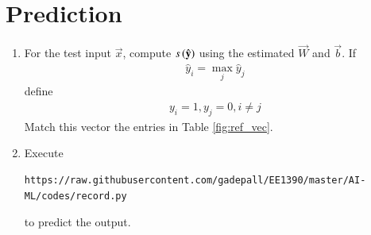 \documentclass[journal,12pt,twocolumn]{IEEEtran}
\renewcommand\thesection{\arabic{section}}
\begin{document}
%


\section{Prediction}
\begin{enumerate}[label=\thesection.\arabic*
,ref=\thesection.\theenumi]
\item For the test input $\vec{x}$, compute $s\left(\hat{\mathbf{y}}\right)$ using the estimated $\vec{W}$ and $\vec{b}$. If
\begin{align}
\hat{y}_i = \max_{j}\hat{y}_j
\end{align}
define
\begin{align}
y_i = 1,
y_j = 0, i \ne j
\end{align}
Match this vector the entries in Table \ref{fig:ref_vec}.
\item Execute 
\begin{lstlisting}
https://raw.githubusercontent.com/gadepall/EE1390/master/AI-ML/codes/record.py
\end{lstlisting}
%
to predict the output.
\end{enumerate}
\end{document}
